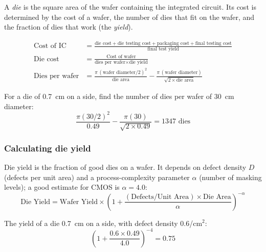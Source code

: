 \begin{definition}[Die]
A \emph{die} is the square area of the wafer containing the integrated
circuit. Its cost is determined by the cost of a wafer, the number of dies
that fit on the wafer, and the fraction of dies that work (the
\emph{yield}).
\end{definition}

\begin{prop}
\begin{align*}
  \text{Cost of IC} &= \frac{\text{die cost} + \text{die testing cost} +
  \text{packaging cost} + \text{final testing cost}}{\text{final test yield}} \\[4pt]
  \text{Die cost} &= \frac{\text{Cost of wafer}}{\text{dies per wafer} \times
  \text{die yield}} \\[4pt]
  \text{Dies per wafer} &= \frac{\pi\,(\text{wafer diameter}/2)^2}{\text{die
  area}} - \frac{\pi\,(\text{wafer diameter})}{\sqrt{2 \times \text{die
  area}}}
\end{align*}
\end{prop}

\begin{eg}
For a die of 0.7~cm on a side, find the number of dies per wafer of 30~cm
diameter:
\[
  \frac{\pi (30/2)^2}{0.49} - \frac{\pi (30)}{\sqrt{2\times 0.49}} = 1347
  \text{ dies}
\]
\end{eg}

\subsubsection{Calculating die yield}
\begin{prop}
Die yield is the fraction of good dies on a wafer. It depends on defect
density $D$ (defects per unit area) and a process-complexity parameter
$\alpha$ (number of masking levels); a good estimate for CMOS is $\alpha
=4.0$:
\[
  \text{Die Yield} = \text{Wafer Yield} \times \left(1 +
  \frac{(\text{Defects/Unit Area}) \times \text{Die Area}}{\alpha}
  \right)^{-\alpha}
\]
\end{prop}

\begin{eg}
The yield of a die 0.7~cm on a side, with defect density 0.6/cm$^2$:
\[
  \left(1 + \frac{0.6 \times 0.49}{4.0}\right)^{-4} = 0.75
\]
\end{eg}

